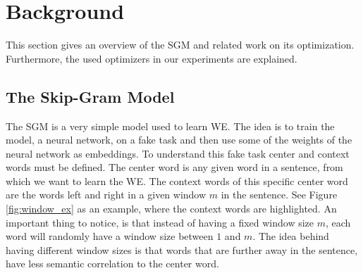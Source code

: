 \chapter{Background}\label{chap:background}
This section gives an overview of the SGM and related work on its optimization. Furthermore, the used optimizers in our experiments are explained.
\section{The Skip-Gram Model}
The SGM is a very simple model used to learn WE. The idea is to train the model, a neural network, on a fake task and then use some of the weights of the neural network as embeddings. To understand this fake task center and context words must be defined. The center word is any given word in a sentence, from which we want to learn the WE. The context words of this specific center word are the words left and right in a given window $m$ in the sentence. See Figure \ref{fig:window_ex} as an example, where the context words are highlighted. An important thing to notice, is that instead of having a fixed window size $m$, each word will randomly have a window size between $1$ and $m$. The idea behind having different window sizes is that words that are further away in the sentence, have less semantic correlation to the center word.

